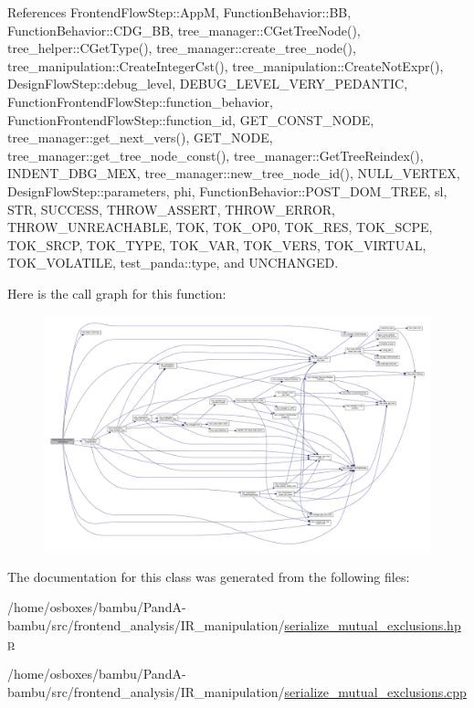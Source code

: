 References Frontend\+Flow\+Step\+::\+AppM, Function\+Behavior\+::\+BB, Function\+Behavior\+::\+C\+D\+G\+\_\+\+BB, tree\+\_\+manager\+::\+C\+Get\+Tree\+Node(), tree\+\_\+helper\+::\+C\+Get\+Type(), tree\+\_\+manager\+::create\+\_\+tree\+\_\+node(), tree\+\_\+manipulation\+::\+Create\+Integer\+Cst(), tree\+\_\+manipulation\+::\+Create\+Not\+Expr(), Design\+Flow\+Step\+::debug\+\_\+level, D\+E\+B\+U\+G\+\_\+\+L\+E\+V\+E\+L\+\_\+\+V\+E\+R\+Y\+\_\+\+P\+E\+D\+A\+N\+T\+IC, Function\+Frontend\+Flow\+Step\+::function\+\_\+behavior, Function\+Frontend\+Flow\+Step\+::function\+\_\+id, G\+E\+T\+\_\+\+C\+O\+N\+S\+T\+\_\+\+N\+O\+DE, tree\+\_\+manager\+::get\+\_\+next\+\_\+vers(), G\+E\+T\+\_\+\+N\+O\+DE, tree\+\_\+manager\+::get\+\_\+tree\+\_\+node\+\_\+const(), tree\+\_\+manager\+::\+Get\+Tree\+Reindex(), I\+N\+D\+E\+N\+T\+\_\+\+D\+B\+G\+\_\+\+M\+EX, tree\+\_\+manager\+::new\+\_\+tree\+\_\+node\+\_\+id(), N\+U\+L\+L\+\_\+\+V\+E\+R\+T\+EX, Design\+Flow\+Step\+::parameters, phi, Function\+Behavior\+::\+P\+O\+S\+T\+\_\+\+D\+O\+M\+\_\+\+T\+R\+EE, sl, S\+TR, S\+U\+C\+C\+E\+SS, T\+H\+R\+O\+W\+\_\+\+A\+S\+S\+E\+RT, T\+H\+R\+O\+W\+\_\+\+E\+R\+R\+OR, T\+H\+R\+O\+W\+\_\+\+U\+N\+R\+E\+A\+C\+H\+A\+B\+LE, T\+OK, T\+O\+K\+\_\+\+O\+P0, T\+O\+K\+\_\+\+R\+ES, T\+O\+K\+\_\+\+S\+C\+PE, T\+O\+K\+\_\+\+S\+R\+CP, T\+O\+K\+\_\+\+T\+Y\+PE, T\+O\+K\+\_\+\+V\+AR, T\+O\+K\+\_\+\+V\+E\+RS, T\+O\+K\+\_\+\+V\+I\+R\+T\+U\+AL, T\+O\+K\+\_\+\+V\+O\+L\+A\+T\+I\+LE, test\+\_\+panda\+::type, and U\+N\+C\+H\+A\+N\+G\+ED.

Here is the call graph for this function\+:
\nopagebreak
\begin{figure}[H]
\begin{center}
\leavevmode
\includegraphics[width=350pt]{db/da1/classSerializeMutualExclusions_a7b0969d1c788283b2c103a5b64d44cca_cgraph}
\end{center}
\end{figure}


The documentation for this class was generated from the following files\+:\begin{DoxyCompactItemize}
\item 
/home/osboxes/bambu/\+Pand\+A-\/bambu/src/frontend\+\_\+analysis/\+I\+R\+\_\+manipulation/\hyperlink{serialize__mutual__exclusions_8hpp}{serialize\+\_\+mutual\+\_\+exclusions.\+hpp}\item 
/home/osboxes/bambu/\+Pand\+A-\/bambu/src/frontend\+\_\+analysis/\+I\+R\+\_\+manipulation/\hyperlink{serialize__mutual__exclusions_8cpp}{serialize\+\_\+mutual\+\_\+exclusions.\+cpp}\end{DoxyCompactItemize}
